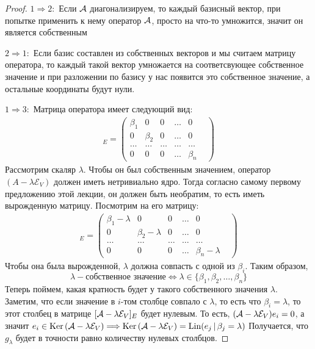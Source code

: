 \begin{proof} \quad

    \quad$1 \Rightarrow 2:$ Если $\mathcal{A}$ диагонализируем, то каждый базисный вектор, при попытке применить к нему оператор $\mathcal{A}$, просто на что-то умножится, значит он является собственным
    
    \quad$2 \Rightarrow 1:$ Если базис составлен из собственных векторов и мы считаем матрицу оператора, то каждый такой вектор умножается на соответсвующее собственное значение и при разложении по базису у нас появится это собственное значение, а остальные координаты будут нули.

    \quad$1 \Rightarrow 3:$ Матрица оператора имеет следующий вид:
    \begin{gather*}
        [\A]_E = \begin{pmatrix}
            \beta_1 & 0 & 0 & \dots & 0 & \\
            0 & \beta_2 & 0 & \dots & 0 & \\
            \dots & \dots & \dots & \dots & \dots \\
            0 & 0 & 0 & \dots & \beta_n
        \end{pmatrix}
    \end{gather*}
    \quad Рассмотрим скаляр $\lambda$. 
    Чтобы он был собственным значением, оператор $(A - \lambda\mathcal{E}_V)$ должен иметь нетривиально ядро. 
    Тогда согласно самому первому предложению этой лекции, он должен быть необратим, то есть иметь вырожденную матрицу.
    Посмотрим на его матрицу:
    \begin{gather*}
        [\A - \lambda\mathcal{E}_V]_E = \begin{pmatrix}
            \beta_1 - \lambda & 0 & 0 & \dots & 0 & \\
            0 & \beta_2 - \lambda & 0 & \dots & 0 & \\
            \dots & \dots & \dots & \dots & \dots \\
            0 & 0 & 0 & \dots & \beta_n - \lambda
        \end{pmatrix}
    \end{gather*}
    \quad Чтобы она была вырожденной, $\lambda$ должна совпасть с одной из $\beta_i$. 
    Таким образом, \[ \lambda - \text{собственное значение} \Leftrightarrow \lambda \in \{\beta_1, \beta_2, \dots, \beta_n \}  \]
    \quad Теперь поймем, какая кратность будет у такого собственного значения $\lambda$.
    Заметим, что если значение в $i$-том столбце совпало с $\lambda$, то есть что $\beta_i = \lambda$, то этот столбец в матрице $[\mathcal{A} - \lambda\mathcal{E}_V]_E$ будет нулевым.
    То есть, $(\mathcal{A} - \lambda\mathcal{E}_V) e_i = 0$, а значит $e_i \in \operatorname{Ker} { (\mathcal{A} - \lambda\mathcal{E}_V) } \Longrightarrow \operatorname{Ker} { (\mathcal{A} - \lambda\mathcal{E}_V) } = \operatorname{Lin} (e_j \, | \, \beta_j = \lambda)$ 
    Получается, что $g_\lambda$ будет в точности равно количеству нулевых столбцов.


\end{proof}

